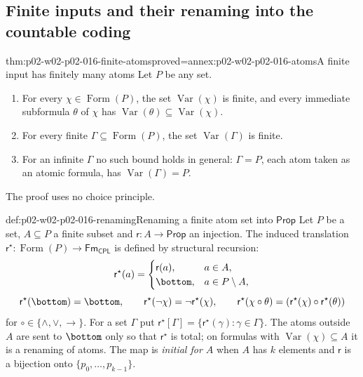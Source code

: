 \subsection{Finite inputs and their renaming into the countable coding}
\label{sec:p02-w02-p02-016-transfer}

\begin{hblemma}{thm:p02-w02-p02-016-finite-atoms}{proved=annex:p02-w02-p02-016-atoms}{A finite input has finitely many atoms}
Let \(P\) be any set.
\begin{enumerate}
\item For every \(\chi\in\operatorname{Form}(P)\), the set
      \(\operatorname{Var}(\chi)\) is finite, and every immediate
      subformula \(\theta\) of \(\chi\) has
      \(\operatorname{Var}(\theta)\subseteq\operatorname{Var}(\chi)\).
\item For every finite \(\Gamma\subseteq\operatorname{Form}(P)\), the set
      \(\operatorname{Var}(\Gamma)\) is finite.
\item For an infinite \(\Gamma\) no such bound holds in general:
      \(\Gamma=P\), each atom taken as an atomic formula, has
      \(\operatorname{Var}(\Gamma)=P\).
\end{enumerate}
The proof uses no choice principle.
\end{hblemma}

\begin{hbdefinition}{def:p02-w02-p02-016-renaming}{Renaming a finite atom set into \(\mathsf{Prop}\)}
Let \(P\) be a set, \(A\subseteq P\) a finite subset and
\(\mathsf r:A\to\mathsf{Prop}\) an injection.  The induced translation
\(\mathsf r^{\star}:\operatorname{Form}(P)\to\mathsf{Fm}_{\mathsf{CPL}}\) is defined
by structural recursion:
\[
 \mathsf r^{\star}(a)=
 \begin{cases}
  \mathsf r(a), & a\in A,\\
  \bottom, & a\in P\setminus A,
 \end{cases}
\]
\[
 \mathsf r^{\star}(\bottom)=\bottom,\qquad
 \mathsf r^{\star}(\neg\chi)=\neg\mathsf r^{\star}(\chi),\qquad
 \mathsf r^{\star}(\chi\circ\theta)=(\mathsf r^{\star}(\chi)\circ\mathsf r^{\star}(\theta))
\]
for \(\circ\in\{\land,\lor,\to\}\).  For a set \(\Gamma\) put
\(\mathsf r^{\star}[\Gamma]=\{\mathsf r^{\star}(\gamma):\gamma\in\Gamma\}\).
The atoms outside \(A\) are sent to \(\bottom\) only so that
\(\mathsf r^{\star}\) is total; on formulas with
\(\operatorname{Var}(\chi)\subseteq A\) it is a renaming of atoms.
The map is \emph{initial for \(A\)} when \(A\) has \(k\) elements and
\(\mathsf r\) is a bijection onto \(\{p_0,\ldots,p_{k-1}\}\).
\end{hbdefinition}

